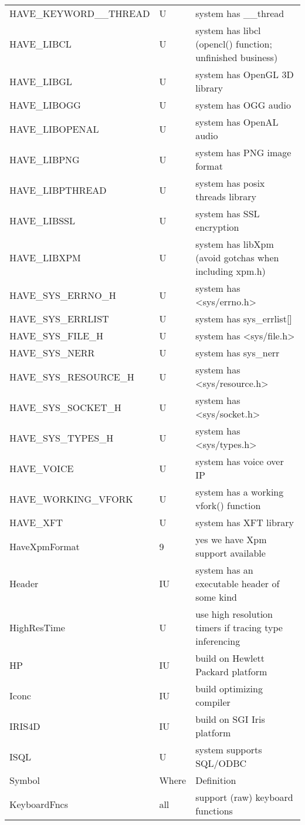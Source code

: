 \begin{xtabular}{|m{1.8in}|m{0.5in}|m{4.0in}|}
HAVE\_KEYWORD\_\_THREAD & U & system has \_\_thread \\
HAVE\_LIBCL & U & system has libcl (opencl() function; unfinished business) \\
HAVE\_LIBGL & U & system has OpenGL 3D library \\
HAVE\_LIBOGG & U & system has OGG audio \\
HAVE\_LIBOPENAL & U & system has OpenAL audio \\
HAVE\_LIBPNG & U & system has PNG image format \\
HAVE\_LIBPTHREAD & U & system has posix threads library \\
HAVE\_LIBSSL & U & system has SSL encryption \\
HAVE\_LIBXPM & U & system has libXpm (avoid gotchas when including xpm.h) \\
HAVE\_SYS\_ERRNO\_H & U & system has <sys/errno.h> \\
HAVE\_SYS\_ERRLIST & U & system has sys\_errlist[] \\
HAVE\_SYS\_FILE\_H & U & system has <sys/file.h> \\
HAVE\_SYS\_NERR & U & system has sys\_nerr \\
HAVE\_SYS\_RESOURCE\_H & U & system has <sys/resource.h> \\
HAVE\_SYS\_SOCKET\_H & U & system has <sys/socket.h> \\
HAVE\_SYS\_TYPES\_H & U & system has <sys/types.h> \\
HAVE\_VOICE & U & system has voice over IP \\
HAVE\_WORKING\_VFORK & U & system has a working vfork() function \\
HAVE\_XFT & U & system has XFT library \\
HaveXpmFormat & 9 & yes we have Xpm support available \\
Header & IU & system has an executable header of some kind \\
HighResTime & U & use high resolution timers if tracing type inferencing \\
HP & IU & build on Hewlett Packard platform \\
Iconc & IU & build optimizing compiler \\
IRIS4D & IU & build on SGI Iris platform \\
ISQL & U & system supports SQL/ODBC \\
Symbol & Where & Definition \\ \hline
KeyboardFncs & all & support (raw) keyboard functions \\

\end{xtabular}
